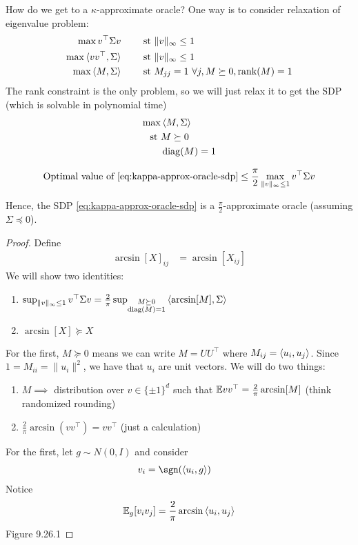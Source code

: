 How do we get to a $\kappa$-approximate oracle? One way is to consider
relaxation of eigenvalue problem:
\begin{align}
  \max v^\top \Sigma v \qquad &\text{ st } \|v\|_\infty \leq 1 \\
  \max \braket{v v^\top, \Sigma} \qquad &\text{ st } \|v\|_\infty \leq 1 \\
  \max \braket{M, \Sigma} \qquad &\text{ st } M_{jj} = 1~\forall j, M \succeq 0, \operatorname{rank}(M) = 1
\end{align}
The rank constraint is the only problem, so we will just relax it
to get the SDP (which is solvable in polynomial time)
\begin{align}
  \max &\braket{M, \Sigma} \label{eq:kappa-approx-oracle-sdp}\\
  \text{st }& M \succeq 0 \nonumber\\
  &\operatorname{diag}(M) = 1 \nonumber
\end{align}

\begin{theorem}[Grothendieck]
  \begin{align}
    \text{Optimal value of \cref{eq:kappa-approx-oracle-sdp}}
    \leq \frac{\pi}{2} \max_{\|v\|_\infty \leq 1} v^\top \Sigma v
  \end{align}

  Hence, the SDP \cref{eq:kappa-approx-oracle-sdp} is a
  $\frac{\pi}{2}$-approximate oracle (assuming $\Sigma \preceq 0$).
\end{theorem}

\begin{proof}
  Define
  \begin{align}
    \arcsin[X]_{ij} &= \arcsin[X_{ij}]
  \end{align}
  We will show two identities:
  \begin{enumerate}
    \item $\sup_{\|v\|_\infty \leq 1} v^\top \Sigma v = \frac{2}{\pi}
      \sup_{\substack{M \succeq 0 \\ \operatorname{diag}(M) = 1}} \braket{\arcsin[M], \Sigma}$
    \item $\arcsin[X] \succeq X$
  \end{enumerate}

  For the first, $M \succeq 0$ means we can write $M = U U^\top$
  where $M_{ij} = \braket{u_i, u_j}$. Since
  $1 = M_{ii} = \|u_i\|^2$, we have that $u_i$ are unit vectors.
  We will do two things:
  \begin{enumerate}
    \item $M \implies$ distribution over $v \in \{\pm 1\}^d$
      such that $\mathbb{E} v v^\top = \frac{2}{\pi} \arcsin[M]$ (think
      randomized rounding)
    \item $\frac{2}{\pi} \arcsin(v v^\top) = v v^\top$ (just a calculation)
  \end{enumerate}
  For the first, let $g \sim N(0,I)$ and consider
  \begin{align}
    v_i &= \sgn(\braket{u_i, g})
  \end{align}
  Notice
  \begin{align}
    \mathbb{E}_g[v_i v_j] = \frac{2}{\pi} \arcsin \braket{u_i, u_j}
  \end{align}
  Figure 9.26.1
\end{proof}
